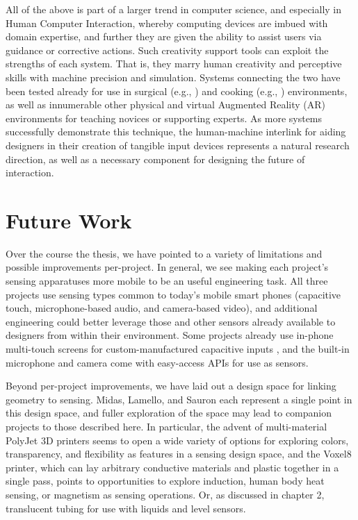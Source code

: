 

All of the above is part of a larger trend in computer science, and especially in Human Computer Interaction, whereby computing devices are imbued with domain expertise, and further they are given the ability to assist users via guidance or corrective actions. Such creativity support tools can exploit the strengths of each system. That is, they marry human creativity and perceptive skills with machine precision and simulation. Systems connecting the two have been tested already for use in surgical (e.g., \cite{kahol-surgical}) and cooking (e.g., \cite{sato-mimicook}) environments, as well as innumerable other physical and virtual Augmented Reality (AR) environments for teaching novices or supporting experts. As more systems successfully demonstrate this technique, the human-machine interlink for aiding designers in their creation of tangible input devices represents a natural research direction, as well as a necessary component for designing the future of interaction.

\section{Future Work}

Over the course the thesis, we have pointed to a variety of limitations and possible improvements per-project. In general, we see making each project's sensing apparatuses more mobile to be an useful engineering task. All three projects use sensing types common to today's mobile smart phones (capacitive touch, microphone-based audio, and camera-based video), and additional engineering could better leverage those and other sensors already available to designers from within their environment. Some projects already use in-phone multi-touch screens for custom-manufactured capacitive inputs \cite{chan-capstones,chang-clipon}, and the built-in microphone and camera come with easy-access APIs for use as sensors.

Beyond per-project improvements, we have laid out a design space for linking geometry to sensing. Midas, Lamello, and Sauron each represent a single point in this design space, and fuller exploration of the space may lead to companion projects to those described here. In particular, the advent of multi-material PolyJet 3D printers seems to open a wide variety of options for exploring colors, transparency, and flexibility as features in a sensing design space, and the Voxel8 \cite{voxel8} printer, which can lay arbitrary conductive materials and plastic together in a single pass, points to opportunities to explore induction, human body heat sensing, or magnetism as sensing operations. Or, as discussed in chapter 2, translucent tubing for use with liquids and level sensors.

